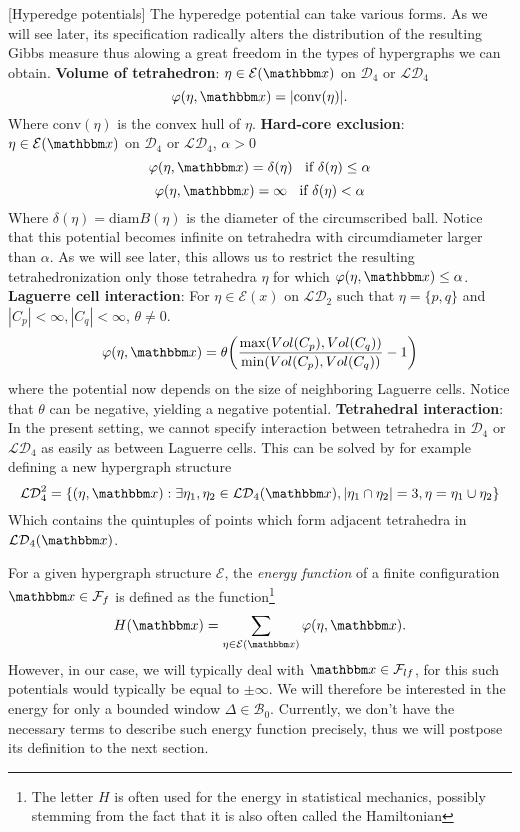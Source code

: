 \begin{example}\label{ex:potentials}[Hyperedge potentials]
	The hyperedge potential can take various forms. As we will see later, its specification radically alters the distribution of the resulting Gibbs measure thus alowing a great freedom in the types of hypergraphs we can obtain.\newline
	\textbf{Volume of tetrahedron}: $\eta\in\mathcal E(\x)$ on $\mathcal D_4$ or $\mathcal {LD}_4$
	$$\varphi(\eta,\x) = |\text{conv}(\eta)| .$$
	Where $\text{conv}(\eta)$ is the convex hull of $\eta$.	\newline
	\textbf{Hard-core exclusion}: $\eta\in\mathcal E(\x)$ on $\mathcal D_4$ or $\mathcal {LD}_4$, $\alpha >0$
	$$\varphi(\eta,\x) = \delta(\eta)\;\; \text{ if } \delta(\eta) \leq \alpha$$
	$$\varphi(\eta,\x) = \infty \;\; \text { if } \delta(\eta) < \alpha$$
	Where $\delta(\eta)= \text{diam}B(\eta)$ is the diameter of the circumscribed ball. Notice that this potential becomes infinite on tetrahedra with circumdiameter larger than $\alpha$. As we will see later, this allows us to restrict the resulting tetrahedronization only those tetrahedra $\eta$ for which $\varphi(\eta,\x) \leq \alpha$.\newline
	\textbf{Laguerre cell interaction}: For $\eta \in \mathcal E(x)$ on $\mathcal {LD}_2$ such that $\eta=\{p,q\}$ and $|C_p| < \infty, |C_q| < \infty$, $\theta \neq 0$.
$$\varphi(\eta,\x) = \theta \bigg (\frac {\max ( Vol(C_p), Vol(C_q))}{\min(Vol(C_p),Vol(C_q))} - 1\bigg)$$
where the potential now depends on the size of neighboring Laguerre cells. Notice that $\theta$ can be negative, yielding a negative potential. \newline
\textbf{Tetrahedral interaction}: In the present setting, we cannot specify interaction between tetrahedra in $\mathcal D_4$ or $\mathcal {LD}_4$ as easily as between Laguerre cells. This can be solved by for example defining a new hypergraph structure
$$\mathcal {LD}^2_4 = \{(\eta,\x): \exists \eta_1,\eta_2\in\mathcal {LD}_4(\x), |\eta_1 \cap \eta_2|=3, \eta = \eta_1 \cup \eta_2\}$$
Which contains the quintuples of points which form adjacent tetrahedra in $\mathcal {LD}_4(\x)$. 
	
\end{example}


For a given hypergraph structure $\mathcal E$, the \textit{energy function} of a finite configuration $\x\in\mathcal F_{f}$ is defined as the function\footnote{The letter $H$ is often used for the energy in statistical mechanics, possibly stemming from the fact that it is also often called the Hamiltonian}
$$H(\x) = \sum_{\eta \in \mathcal E(\x)} \varphi(\eta,\x).$$
However, in our case, we will typically deal with $\x\in \mathcal F_{lf}$, for this such potentials would typically be equal to $\pm \infty$. We will therefore be interested in the energy for only a bounded window $\Delta \in \mathcal B_0$. Currently, we don't have the necessary terms to describe such energy function precisely, thus we will postpose its definition to the next section. 

